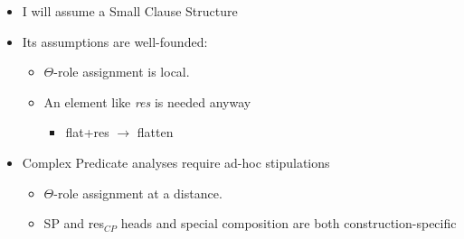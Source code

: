 \documentclass[Proposal]{subfiles}
\begin{document}
\begin{frame}
  
  \begin{itemize}
    \item I will assume a Small Clause Structure
      \pause
    \item Its assumptions are well-founded:
      \pause
      \begin{itemize}
	\item $\Theta$-role assignment is local.
      \pause
	\item An element like \textit{res} is needed anyway
	  \begin{itemize}
	    \item {\rm flat}+res $\rightarrow$ {\rm flatten}
	  \end{itemize}
      \end{itemize}
      \pause
    \item Complex Predicate analyses require ad-hoc stipulations
      \pause
      \begin{itemize}
      \pause
	\item $\Theta$-role assignment at a distance.
      \pause
        \item SP and res$_{CP}$ heads and special composition are both construction-specific
      \end{itemize}
  \end{itemize}
\end{frame}
\end{document}
